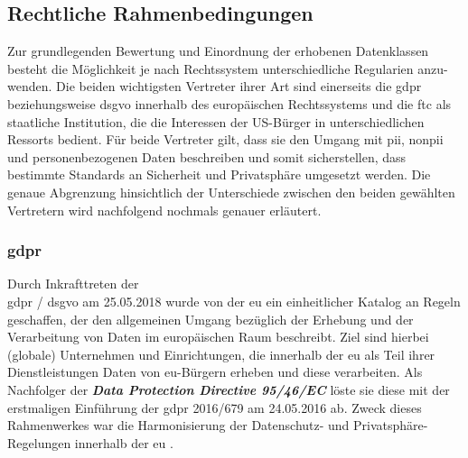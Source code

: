 \subsection{Rechtliche Rahmenbedingungen}
\label{sec:Grundlagen:ssec:Rechtliche Rahmenbedingungen}

Zur grundlegenden Bewertung und Einordnung der erhobenen Datenklassen besteht die Möglichkeit je nach Rechtssystem unterschiedliche Regularien anzu-wenden. Die beiden wichtigsten Vertreter ihrer Art sind einerseits die \acl{gdpr} beziehungsweise \acl{dsgvo} innerhalb des europäischen Rechtssystems und die \acl{ftc} als staatliche Institution, die die Interessen der US-Bürger in unterschiedlichen Ressorts bedient. 
Für beide Vertreter gilt, dass sie den Umgang mit \ac{pii}, \ac{nonpii} und personenbezogenen Daten beschreiben und somit sicherstellen, dass bestimmte Standards an Sicherheit und Privatsphäre umgesetzt werden. Die genaue Abgrenzung hinsichtlich der Unterschiede zwischen den beiden gewählten Vertretern wird nachfolgend nochmals genauer erläutert.

\subsubsection{\acl{gdpr}}
\label{sec:Grundlagen:ssec:Rechtliche Rahmenbedingungen:sssec:GDPR}

Durch Inkrafttreten der \\ \ac{gdpr} / \ac{dsgvo} am 25.05.2018 wurde von der \acl{eu} ein einheitlicher Katalog an Regeln geschaffen, der den allgemeinen Umgang bezüglich der Erhebung und der Verarbeitung von Daten im europäischen Raum beschreibt. 
Ziel sind hierbei (globale) Unternehmen und Einrichtungen, die innerhalb der \acl{eu} als Teil ihrer Dienstleistungen Daten von \acs{eu}-Bürgern erheben und diese verarbeiten. Als Nachfolger der \textbf{\textit{Data Protection Directive 95/46/EC}} löste sie diese mit der erstmaligen Einführung der \ac{gdpr} 2016/679 am 24.05.2016 ab. 
Zweck dieses Rahmenwerkes war die Harmonisierung der Datenschutz- und Privatsphäre-Regelungen innerhalb der \acl{eu} \cite{Bastos2019}.

